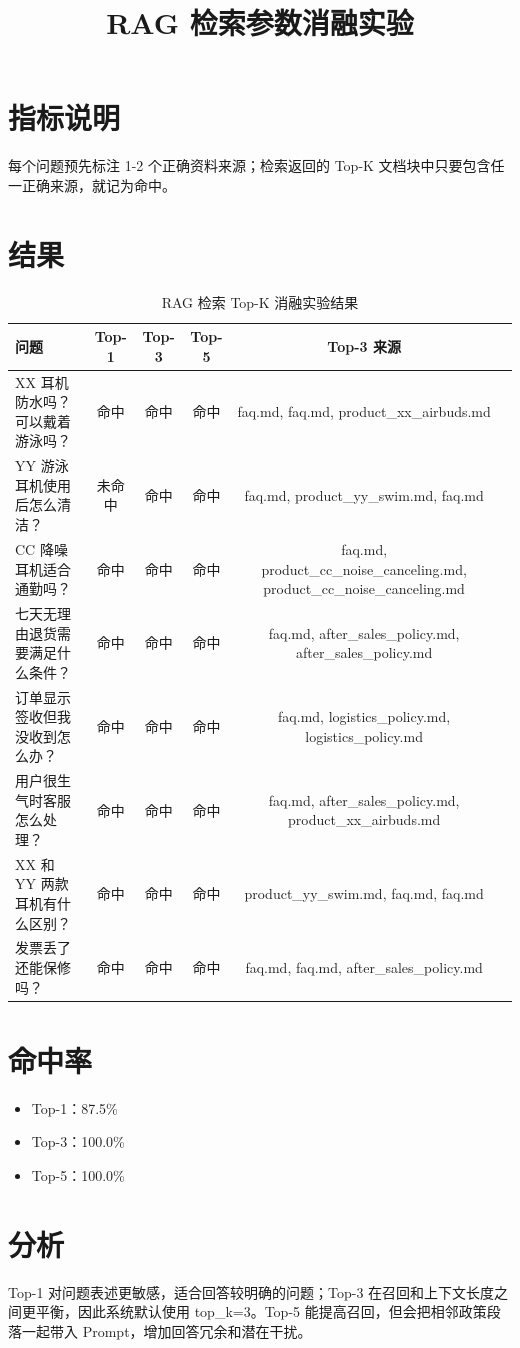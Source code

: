 \documentclass[12pt,a4paper]{ctexart}
\title{RAG 检索参数消融实验}
\author{}
\date{}
\begin{document}
\maketitle

\section{指标说明}

每个问题预先标注 1-2 个正确资料来源；检索返回的 Top-K 文档块中只要包含任一正确来源，就记为命中。

\section{结果}

\begin{table}[htbp]
\centering
\caption{RAG 检索 Top-K 消融实验结果}
\begin{tabular}{p{1.5cm}ccccp{3cm}}
\toprule
问题 & Top-1 & Top-3 & Top-5 & Top-3 来源 \\
\midrule
XX 耳机防水吗？可以戴着游泳吗？ & 命中 & 命中 & 命中 & faq.md, faq.md, product\_xx\_airbuds.md \\
YY 游泳耳机使用后怎么清洁？ & 未命中 & 命中 & 命中 & faq.md, product\_yy\_swim.md, faq.md \\
CC 降噪耳机适合通勤吗？ & 命中 & 命中 & 命中 & faq.md, product\_cc\_noise\_canceling.md, product\_cc\_noise\_canceling.md \\
七天无理由退货需要满足什么条件？ & 命中 & 命中 & 命中 & faq.md, after\_sales\_policy.md, after\_sales\_policy.md \\
订单显示签收但我没收到怎么办？ & 命中 & 命中 & 命中 & faq.md, logistics\_policy.md, logistics\_policy.md \\
用户很生气时客服怎么处理？ & 命中 & 命中 & 命中 & faq.md, after\_sales\_policy.md, product\_xx\_airbuds.md \\
XX 和 YY 两款耳机有什么区别？ & 命中 & 命中 & 命中 & product\_yy\_swim.md, faq.md, faq.md \\
发票丢了还能保修吗？ & 命中 & 命中 & 命中 & faq.md, faq.md, after\_sales\_policy.md \\
\bottomrule
\end{tabular}
\end{table}

\section{命中率}

\begin{itemize}
    \item Top-1：87.5\%
    \item Top-3：100.0\%
    \item Top-5：100.0\%
\end{itemize}

\section{分析}

Top-1 对问题表述更敏感，适合回答较明确的问题；Top-3 在召回和上下文长度之间更平衡，因此系统默认使用 top\_k=3。Top-5 能提高召回，但会把相邻政策段落一起带入 Prompt，增加回答冗余和潜在干扰。
\end{document}
